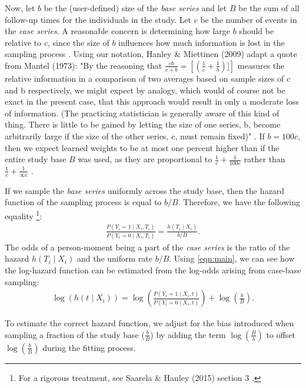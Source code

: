 \documentclass[APA,LATO1COL]{WileyNJD-v2}
\begin{document}
Now, let \(b\) be the (user-defined) size of the \emph{base series} and let \(B\) be the sum of all follow-up
times for the individuals in the study. Let $c$ be the number of events in the \emph{case series}. A
reasonable concern is determining how large $b$ should be relative to $c$, since the size of \(b\)
influences how much information is lost in the sampling process \citep{hanley2009}. Using our notation,
Hanley $\&$ Miettinen (2009) adapt a quote from Mantel (1973): "By the reasoning that
$\frac{cb}{c+b}=\left[\left( \frac{1}{c}+\frac{1}{b}\right)]\right]$ measures the relative information in a comparison of two
averages based on sample sizes of c and b respectively, we might expect by analogy, which would
of course not be exact in the present case, that this approach would result in only a moderate loss of
information. (The practicing statistician is generally aware of this kind of thing. There is little to be gained
by letting the size of one series, b, become arbitrarily large if the size of the other series, c, must remain
fixed)" \citep{hanley2009} \citep{mantel1}. If $b=100c$, then we expect learned weights to be at most one
percent higher than if the entire study base $B$ was used, as they are proportional to
$\frac{1}{c}+\frac{1}{100c}$ rather than $\frac{1}{c}+\frac{1}{\infty c}$ \citep{hanley2009}.

If we sample the \emph{base series} uniformly across the study base, then the hazard function
of the sampling process is equal to \(b/B\). Therefore, we have the following equality \cite{saarela2015}
\footnote{For a rigorous treatment, see Saarela \& Hanley (2015) section 3 \cite{saarela2015} .}:
\begin{align}\label{eqn:main}
\frac{P\left(Y_i=1 \mid X_i, T_i\right)}{P\left(Y_i = 0 \mid X_i, T_i\right)} = \frac{h\left(T_i \mid X_i\right)}{b/B}.
\end{align} The odds of a person-moment being a part of the \emph{case
series} is the ratio of the hazard \(h(T_i \mid X_i)\) and the uniform
rate \(b/B\). Using \eqref{eqn:main}, we can see how the log-hazard
function can be estimated from the log-odds arising from case-base
sampling: \begin{align}\label{eqn:offset}
\log \left( h\left(t \mid X_i\right)\right) = \log \left(\frac{P\left(Y_i = 1 \mid X_i, t\right)}{P\left(Y_i = 0 \mid X_i, t\right)}\right) + \log\left(\frac{b}{B}\right).
\end{align}

To estimate the correct hazard function, we adjust for the bias introduced when sampling a fraction of the
study base (\(\frac{b}{B}\)) by adding the term \(\log\left(\frac{B}{b} \right)\) to offset \(\log\left(\frac{b}{B} \right)\)
during the fitting process.
\end{document}

